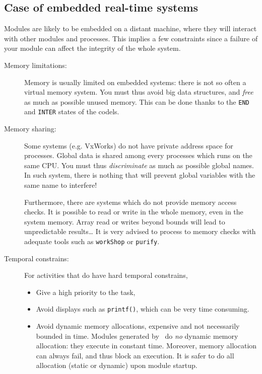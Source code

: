 \subsection{Case of embedded real-time systems}

Modules are likely  to be embedded on  a distant machine, where they will
interact  with other modules  and     processes.   This implies a     few
constraints since a  failure of your module can  affect the integrity  of
the whole system.

\begin{description}
\item[Memory limitations:]
Memory is  usually limited on  embedded systems: there is  not so often a
virtual memory system. You must thus avoid big  data structures, and {\em
free} as much as  possible unused memory. This  can be done thanks to the
\texttt{END} and \texttt{INTER} states of the codels.

\item[Memory sharing:]
Some  systems (e.g. VxWorks)   do not  have   private address  space  for
processes. Global data is shared among every processes  which runs on the
same CPU. You  must thus \emph{discriminate} as  much  as possible global
names.  In   such system, there   is nothing  that will   prevent  global
variables with the same name to interfere!

Furthermore, there are systems which do not provide memory access checks.
It is possible to  read or write in the whole memory,  even in the system
memory. Array  read or  writes beyond bounds  will lead  to unpredictable
results\ldots{}  It is  very advised  to  process to  memory checks  with
adequate tools such as \texttt{workShop} or \texttt{purify}.

\item[Temporal constrains:]

For activities that do have hard temporal constrains,
\begin{itemize}
\item Give a high priority to the task,
\item Avoid displays such as \texttt{printf()}, which can be very time
consuming.
\item Avoid dynamic memory allocations, expensive and not necessarily
bounded in time.  Modules generated by \GenoM\ do \emph{no} dynamic memory
allocation: they execute in  constant time.  Moreover, memory  allocation
can always fail, and  thus block  an execution.  It  is  safer to do  all
allocation (static or dynamic) upon module startup.
\end{itemize} 


\end{description}
